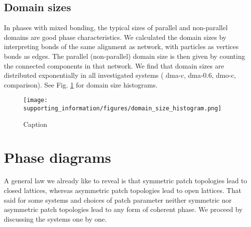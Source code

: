 \documentclass[a4paper,preprint]{revtex4}
\begin{document}
\subsection{Domain sizes}
In phases with mixed bonding, the typical sizes of parallel and non-parallel domains are good phase characteristics. 
We calculated the domain sizes by interpreting bonds of the same alignment as network, with particles as vertices bonds as edges. The parallel (non-parallel) domain size is then given by counting the connected components in that network. 
We find that domain sizes are distributed exponentially in all investigated systems ( dma-c, dma-0.6, dmo-c, comparison). See Fig. \ref{fig:domain_sizes} for domain size histograms.
\begin{figure}
    \centering
    \texttt{[image: supporting\_information/figures/domain\_size\_histogram.png]}
    \caption{Caption}
    \label{fig:domain_sizes}
\end{figure}


\section{Phase diagrams}



A general law we already like to reveal is that symmetric patch topologies lead to closed lattices, whereas asymmetric patch topologies lead to open lattices. That said for some systems and choices of patch parameter neither symmetric nor asymmetric patch topologies lead to any form of coherent phase. We proceed by discussing the systems one by one.
\end{document}
